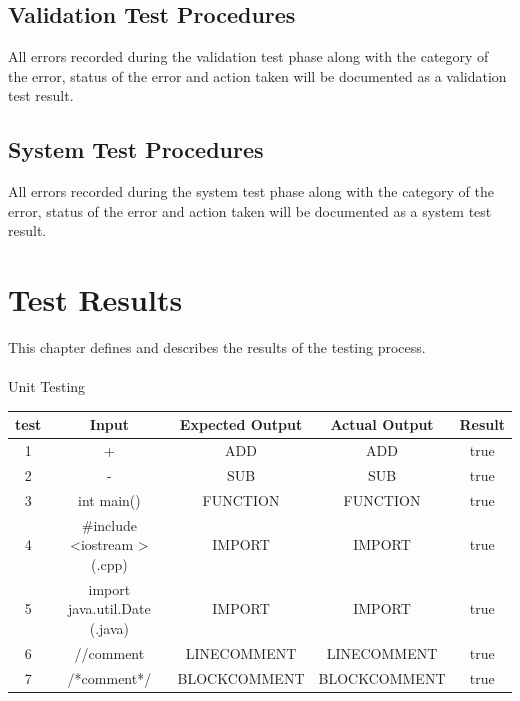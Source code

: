 \documentclass{scrreprt}
\begin{document}
	\section{Validation Test Procedures}
	All errors recorded during the validation test phase along with the category of the error, status of the error and action taken will be documented as a validation test result.
	
	\section{System Test Procedures}
	All errors recorded during the system test phase along with the category of the error, status of the error and action taken will be documented as a system test result.
	
	

	{\let\clearpage\relax \chapter{Test Results}}
	This chapter defines and describes the results of the testing process.\\\\
	
	Unit Testing\\
	\begin{tabular}{|c|c|c|c|c|}
		\hline
		test & Input & Expected Output & Actual Output & Result \\ \hline
		1 & + & ADD & ADD & true\\ \hline
		2 & - & SUB & SUB & true\\ \hline
		3 & int main() & FUNCTION & FUNCTION & true\\ \hline
		4 & \#include \textless iostream \textgreater (.cpp) & IMPORT & IMPORT & true\\ \hline
		5 & import java.util.Date (.java) & IMPORT & IMPORT & true\\ \hline
		6 & //comment & LINECOMMENT & LINECOMMENT & true\\ \hline
		7 & /*comment*/ & BLOCKCOMMENT & BLOCKCOMMENT & true\\ \hline
		
	\end{tabular} \\\\
	
\end{document}

